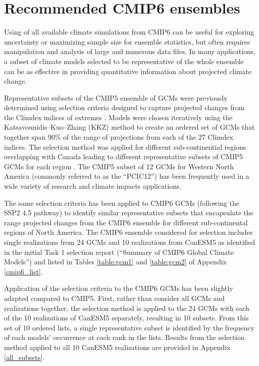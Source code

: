 \documentclass[]{scrartcl}
\begin{document}

\clearpage

\section{Recommended CMIP6 ensembles}\label{selection}

Using of all available climate simulations from CMIP6 can be useful for exploring uncertainty or maximizing sample size for ensemble statistics, but often requires manipulation and analysis of large and numerous data files. In many applications, a subset of climate models selected to be representative of the whole ensemble can be as effective in providing quantitative information about projected climate change. 

Representative subsets of the CMIP5 ensemble of GCMs were previously determined using selection criteria \citep{cannon_selecting_2014} designed to capture projected changes from the Climdex indices of extremes \citep{Zhang2011}. Models were chosen iteratively using the Katsavounidis–Kuo–Zhang (KKZ) method to create an ordered set of GCMs that together span $90\%$ of the range of projections from each of the 27 Climdex indices. The selection method was applied for different sub-continential regions \citep{Giorgi2000} overlapping with Canada leading to different representative subsets of CMIP5 GCMs for each region \citep{cannon_selecting_2014}. The CMIP5 subset of 12 GCMs for Western North America (commonly referred to as the ``PCIC12'') has been frequently used in a wide variety of research and climate impacts applications. 

The same selection criteria has been applied to CMIP6 GCMs (following the SSP2 4.5 pathway) to identify similar representative subsets that encapsulate the range projected changes from the CMIP6 ensemble for different sub-continental regions of North America. The CMIP6 ensemble considered for selection includes single realizations from 24 GCMs and 10 realizations from CanESM5 as identified in the initial Task 1 selection report (``Summary of CMIP6 Global Climate Models'') and listed in Tables \ref{table:gcm1} and \ref{table:gcm2} of Appendix \ref{cmip6_list}. 

Application of the selection criteria to the CMIP6 GCMs has been slightly adapted compared to CMIP5. First, rather than consider all GCMs and realizations together, the selection method is applied to the 24 GCMs with each of the 10 realizations of CanESM5 separately, resulting in 10 subsets. From this set of 10 ordered lists, a single representative subset is identified by the frequency of each models' occurrence at each rank in the lists. Results from the selection method applied to all 10 CanESM5 realizations are provided in Appendix \ref{all_subsets}.
\end{document}
